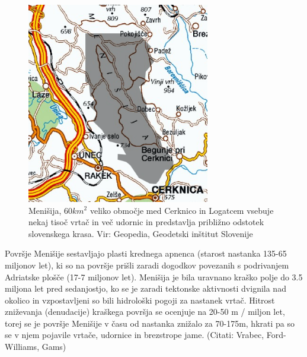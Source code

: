 \documentclass[a4paper, oneside, 12pt]{book}
\begin{document}
\begin{figure}[H]
  \centering
  \includegraphics[width=8cm]{slike/menisija-karta}
  \caption{Menišija, $60 km^2$ veliko območje med Cerknico in Logatcem vsebuje nekaj tisoč vrtač in več udornic in predstavlja približno odstotek slovenskega krasa. Vir: Geopedia, Geodetski inštitut Slovenije}
  \label{fig:menisija-karta}
\end{figure}

Površje Menišije sestavljajo plasti krednega apnenca (starost nastanka 135-65 miljonov let), ki so na površje prišli zaradi dogodkov povezanih s podrivanjem Adriatske plošče (17-7 miljonov let). Menišija je bila uravnano kraško polje do 3.5 miljona let pred sedanjostjo, ko se je zaradi tektonske aktivnosti dvignila nad okolico in vzpostavljeni so bili hidrološki pogoji za nastanek vrtač. Hitrost zniževanja (denudacije) kraškega površja se ocenjuje na 20-50 m / miljon let, torej se je površje Menišije v času od nastanka znižalo za 70-175m, hkrati pa so se v njem pojavile vrtače, udornice in brezstrope jame. (Citati: Vrabec, Ford-Williams, Gams)
\end{document}
